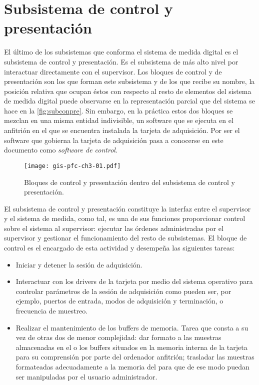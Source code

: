 \chapter{Subsistema de control y presentación}\label{chap:control}

El último de los subsistemas que conforma el sistema de medida digital es
el subsistema de control y presentación. Es el subsistema de más alto nivel
por interactuar directamente con el supervisor. Los bloques de control y de
presentación son los que forman este subsistema y de los que recibe su
nombre, la posición relativa que ocupan éstos con respecto al resto de
elementos del sistema de medida digital puede observarse en la
representación parcial que del sistema se hace en la \vref{fig:subconpre}.
Sin embargo, en la práctica estos dos bloques se mezclan en una misma
entidad indivisible, un software que se ejecuta en el \pc{} anfitrión en el
que se encuentra instalada la tarjeta de adquisición. Por ser el software
que gobierna la tarjeta de adquisición pasa a conocerse en este documento
como \emph{software de control}.

\begin{figure}
	\begin{center}
		\texttt{[image: gis-pfc-ch3-01.pdf]}
	\end{center}
	\caption[Subsistema de control y presentación] {Bloques de control
	y presentación dentro del subsistema de control y presentación.}
	\label{fig:subconpre}
\end{figure}

El subsistema de control y presentación constituye la interfaz entre el
supervisor y el sistema de medida, como tal, es una de sus funciones
proporcionar control sobre el sistema al supervisor: ejecutar las órdenes
administradas por el supervisor y gestionar el funcionamiento del resto de
subsistemas. El bloque de control es el encargado de esta actividad y
desempeña las siguientes tareas:

\begin{itemize}
    \item Iniciar y detener la sesión de adquisición.
    \item Interactuar con los drivers de la tarjeta por medio del sistema
	operativo para controlar parámetros de la sesión de adquisición
	como pueden ser, por ejemplo, puertos de entrada, modos de
	adquisición y terminación, o frecuencia de muestreo.
    \item Realizar el mantenimiento de los buffers de memoria. Tarea que
	consta a su vez de otras dos de menor complejidad: dar formato a
	las muestras almacenadas en el o los buffers situados en la memoria
	interna de la tarjeta para su comprensión por parte del ordenador
	anfitrión; trasladar las muestras formateadas adecuadamente a la
	memoria del \pc{} para que de ese modo puedan ser manipuladas por
	el usuario administrador.
\end{itemize}

